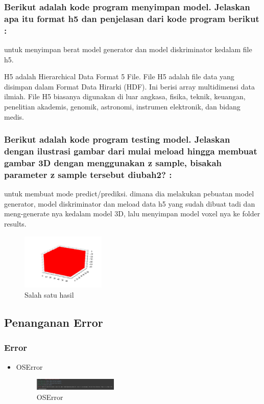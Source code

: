 \subsubsection{Berikut adalah kode program menyimpan model. Jelaskan apa itu format h5 dan penjelasan dari kode program berikut :}
\hfill\break

untuk menyimpan berat model generator dan model diskriminator kedalam file h5.

H5 adalah Hierarchical Data Format 5 File.
File H5 adalah file data yang disimpan dalam Format Data Hirarki (HDF). Ini berisi array multidimensi data ilmiah. File H5 biasanya digunakan di luar angkasa, fisika, teknik, keuangan, penelitian akademis, genomik, astronomi, instrumen elektronik, dan bidang medis.


\subsubsection{Berikut adalah kode program testing model. Jelaskan dengan ilustrasi gambar dari mulai meload hingga membuat gambar 3D dengan menggunakan z sample, bisakah parameter z sample tersebut diubah2? :}
\hfill\break

untuk membuat mode predict/prediksi. dimana dia melakukan pebuatan model generator, model diskriminator dan meload data h5 yang sudah dibuat tadi dan meng-generate nya kedalam model 3D, lalu menyimpan model voxel nya ke folder results.
\begin{figure}[H]
\centering
	\includegraphics[width=4cm]{figures/1174066/8/img_0_0_0.png}
\caption{Salah satu hasil}
\end{figure}


\subsection{Penanganan Error}
\subsubsection{Error}
\hfill\break
\begin{itemize}
\item OSError

\begin{figure}[H]
\centering
	\includegraphics[width=4cm]{figures/1174066/8/error1.jpg}
\caption{OSError}
\end{figure}
\end{itemize}
